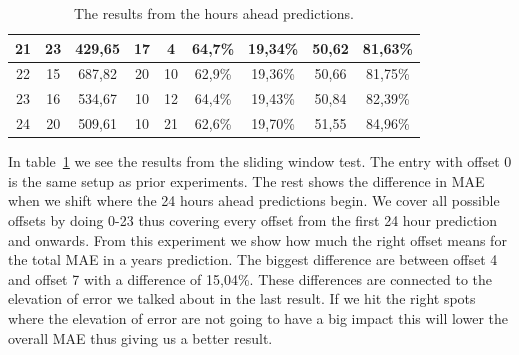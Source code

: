 \begin{table}[H]
{\begin{tabular}{|c|c|c|c|c|c|c|c|c|}
	21 & 23  & 429,65 & 17 & 4  & 64,7\% & 19,34\% & 50,62 & 81,63\% \\ \hline
	22 & 15  & 687,82 & 20 & 10 & 62,9\% & 19,36\% & 50,66 & 81,75\% \\ \hline
	23 & 16  & 534,67 & 10 & 12 & 64,4\% & 19,43\% & 50,84 & 82,39\% \\ \hline
	24 & 20  & 509,61 & 10 & 21 & 62,6\% & 19,70\% & 51,55 & 84,96\% \\ \hline
	\end{tabular}
}
\caption{The results from the hours ahead predictions.} %
\label{table:XHoursAhead} %
\end{table}

In table~\ref{table:XHoursAhead} we see the results from the sliding window test. The entry with offset 0 is the same setup as prior experiments. The rest shows the difference in MAE when we shift where the 24 hours ahead predictions begin. We cover all possible offsets by doing 0-23 thus covering every offset from the first 24 hour prediction and onwards. From this experiment we show how much the right offset means for the total MAE in a years prediction. The biggest difference are between offset 4 and offset 7 with a difference of 15,04\%. These differences are connected to the elevation of error we talked about in the last result. If we hit the right spots where the elevation of error are not going to have a big impact this will lower the overall MAE thus giving us a better result.  


